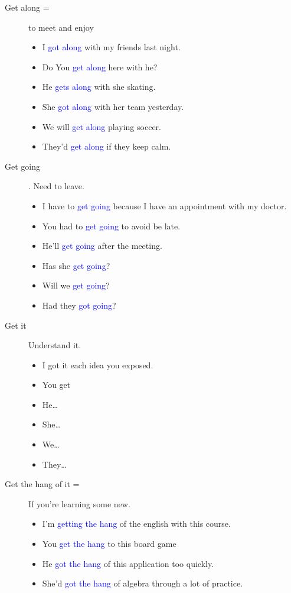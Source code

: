 \begin{multicols}{2}
\begin{description}
\item [Get along =] to meet and enjoy
\begin{itemize}	
\item I \textcolor{blue}{got along} with my friends last night.
\item Do You \textcolor{blue}{get along} here with he?
\item He \textcolor{blue}{gets along} with she skating.
\item She \textcolor{blue}{got along} with her team yesterday.
\item We will \textcolor{blue}{get along} playing soccer.
\item They'd \textcolor{blue}{get along} if they keep calm.
\end{itemize}
\item [Get going]. Need to leave.
\begin{itemize}
\item I have to \textcolor{blue}{get going} because I have an appointment with my doctor.
\item You had to \textcolor{blue}{get going} to avoid be late.
\item He'll \textcolor{blue}{get going} after the meeting.
\item Has she \textcolor{blue}{get going}?
\item Will we \textcolor{blue}{get going}?
\item Had they \textcolor{blue}{got going}?
\end{itemize}
\item[Get it] Understand it.
\begin{itemize}
\item I got it each idea you exposed.
\item You get 
\item He\dots
\item She\dots
\item We\dots
\item They\dots
\end{itemize}
\item [Get the hang of it =] If you're learning some new.
\begin{itemize}
\item I'm \textcolor{blue}{getting the hang} of the english with this course.
\item You \textcolor{blue}{get the hang} to this board game
\item He \textcolor{blue}{got the hang} of this application too quickly.
\item She'd \textcolor{blue}{got the hang} of algebra through a lot of practice.

\end{itemize}
\end{description}
\end{multicols}
